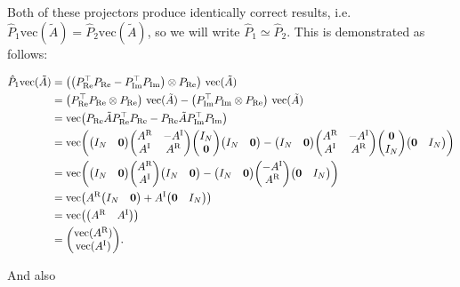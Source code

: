 \documentclass{article}
\newcommand{\AR}{A^{\text{R}}}
\newcommand{\AI}{A^{\text{I}}}
\newcommand{\Pre}{P_{\text{Re}}}
\newcommand{\Pim}{P_{\text{Im}}}
\begin{document}
\noindent
Both of these projectors produce identically correct results, i.e. $\hat P_1 \text{vec}(\tilde A) = \hat P_2 \text{vec}(\tilde A)$, so we will write $\hat P_1 \simeq \hat P_2$. This is demonstrated as follows: 

\begin{align*}
  \hat P_1 \text{vec}(\tilde A) 
  &= \qty(\qty(\Pre^\top\Pre - \Pim^\top\Pim) \otimes \Pre) \ \text{vec}(\tilde A) \\
  &= \qty(\Pre^\top\Pre \otimes \Pre) \ \text{vec}(\tilde A) - \qty(\Pim^\top\Pim \otimes \Pre) \ \text{vec}(\tilde A) \\
  &= \text{vec}\qty(\Pre \tilde A \Pre^\top\Pre - \Pre \tilde A \Pim^\top\Pim) \\
  &= \text{vec}\qty(\mqty(I_N & \vb{0}) \mqty(\AR & -\AI \\ \AI & \AR) \mqty(I_N \\ \vb{0}) \mqty(I_N & \vb{0}) - \mqty(I_N & \vb{0}) \mqty(\AR & -\AI \\ \AI & \AR) \mqty(\vb{0} \\ I_N) \mqty(\vb{0} & I_N)) \\
  &= \text{vec}\qty(\mqty(I_N & \vb{0}) \mqty(\AR \\ \AI) \mqty(I_N & \vb{0}) - \mqty(I_N & \vb{0}) \mqty(-\AI \\ \AR) \mqty(\vb{0} & I_N)) \\
  &= \text{vec}\qty(\AR\mqty(I_N & \vb{0}) + \AI \mqty(\vb{0} & I_N)) \\
  &= \text{vec}\qty(\mqty(\AR & \AI)) \\
  &= \mqty(\text{vec}(\AR) \\ \text{vec}(\AI)).
\end{align*}

\noindent
And also
\end{document}
